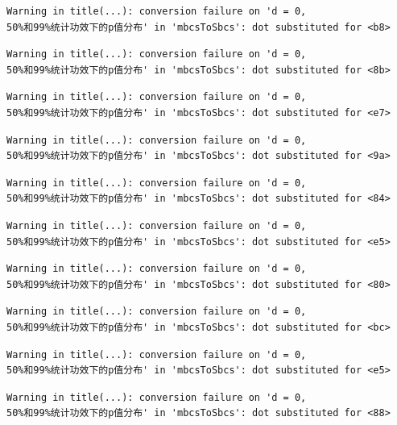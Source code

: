 \documentclass[
  letterpaper,
  DIV=11,
  numbers=noendperiod]{scrreprt}
\begin{document}
\begin{verbatim}
Warning in title(...): conversion failure on 'd = 0,
50%和99%统计功效下的p值分布' in 'mbcsToSbcs': dot substituted for <b8>
\end{verbatim}

\begin{verbatim}
Warning in title(...): conversion failure on 'd = 0,
50%和99%统计功效下的p值分布' in 'mbcsToSbcs': dot substituted for <8b>
\end{verbatim}

\begin{verbatim}
Warning in title(...): conversion failure on 'd = 0,
50%和99%统计功效下的p值分布' in 'mbcsToSbcs': dot substituted for <e7>
\end{verbatim}

\begin{verbatim}
Warning in title(...): conversion failure on 'd = 0,
50%和99%统计功效下的p值分布' in 'mbcsToSbcs': dot substituted for <9a>
\end{verbatim}

\begin{verbatim}
Warning in title(...): conversion failure on 'd = 0,
50%和99%统计功效下的p值分布' in 'mbcsToSbcs': dot substituted for <84>
\end{verbatim}

\begin{verbatim}
Warning in title(...): conversion failure on 'd = 0,
50%和99%统计功效下的p值分布' in 'mbcsToSbcs': dot substituted for <e5>
\end{verbatim}

\begin{verbatim}
Warning in title(...): conversion failure on 'd = 0,
50%和99%统计功效下的p值分布' in 'mbcsToSbcs': dot substituted for <80>
\end{verbatim}

\begin{verbatim}
Warning in title(...): conversion failure on 'd = 0,
50%和99%统计功效下的p值分布' in 'mbcsToSbcs': dot substituted for <bc>
\end{verbatim}

\begin{verbatim}
Warning in title(...): conversion failure on 'd = 0,
50%和99%统计功效下的p值分布' in 'mbcsToSbcs': dot substituted for <e5>
\end{verbatim}

\begin{verbatim}
Warning in title(...): conversion failure on 'd = 0,
50%和99%统计功效下的p值分布' in 'mbcsToSbcs': dot substituted for <88>
\end{verbatim}
\end{document}
